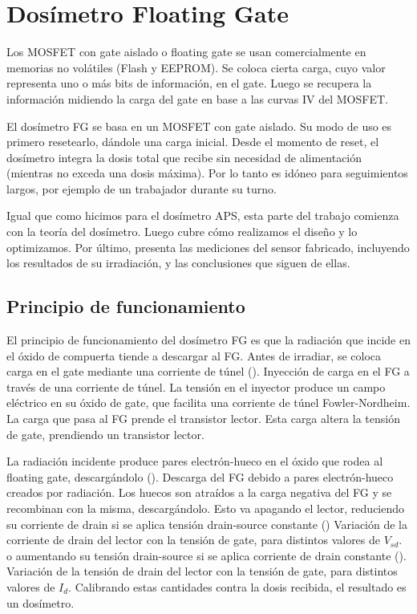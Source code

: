 \section{Dosímetro Floating Gate}
Los MOSFET con gate aislado o floating gate se usan comercialmente
en memorias no volátiles (Flash y EEPROM).
Se coloca cierta carga, 
cuyo valor representa uno o más bits de información, en el gate.
Luego se recupera la información midiendo la carga del gate
en base a las curvas IV del MOSFET.

El dosímetro FG se basa en un MOSFET con gate aislado.
Su modo de uso es primero resetearlo, dándole una carga inicial.
Desde el momento de reset, el dosímetro integra 
la dosis total que recibe sin necesidad de alimentación
(mientras no exceda una dosis máxima).
Por lo tanto es idóneo para seguimientos largos,
por ejemplo de un trabajador durante su turno.

Igual que como hicimos para el dosímetro APS,
esta parte del trabajo comienza con la teoría del dosímetro.
Luego cubre cómo realizamos el diseño y lo optimizamos.
Por último, presenta las mediciones del sensor fabricado,
incluyendo los resultados de su irradiación,
y las conclusiones que siguen de ellas.
%
\subsection{Principio de funcionamiento}
El principio de funcionamiento del dosímetro FG 
es que la radiación que incide
en el óxido de compuerta tiende a descargar al FG.
Antes de irradiar,
se coloca carga en el gate mediante una corriente de túnel 
().
{ Inyección de carga en el FG a través de una corriente de túnel.
La tensión en el inyector produce un campo eléctrico en su óxido de gate,
que facilita una corriente de túnel Fowler-Nordheim.
La carga que pasa al FG prende el transistor lector.}
Esta carga altera la tensión de gate, prendiendo un transistor lector.

La radiación incidente produce pares electrón-hueco en el óxido
que rodea al floating gate, descargándolo
().
{ Descarga del FG debido a pares electrón-hueco creados por
radiación.
Los huecos son atraídos a la carga negativa del FG y
se recombinan con la misma, descargándolo.}
Esto va apagando el lector,
reduciendo su corriente de drain si se aplica tensión drain-source constante
()
{Variación de la corriente de drain del lector con la tensión de gate,
para distintos valores de $V_{sd}$.}
o aumentando su tensión drain-source si se aplica corriente de drain constante
().
{Variación de la tensión de drain del lector con la tensión de gate,
para distintos valores de $I_d$.}
Calibrando estas cantidades contra la dosis recibida, 
el resultado es un dosímetro.
%
